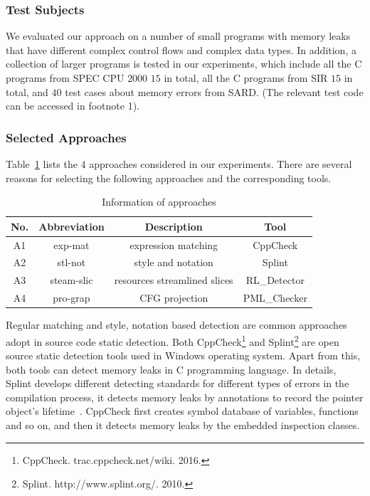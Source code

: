 \subsubsection{Test Subjects}\label{ssec:ts}
We evaluated our approach on a number of small programs with memory leaks that have different complex control flows and complex data types. In addition, a collection of larger programs is tested in our experiments, which include all the C programs from SPEC CPU $2000$ $15$ in total, all the C programs from SIR $15$ in total, and $40$ test cases about memory errors from SARD. (The relevant test code can be accessed in footnote 1).
\subsubsection{Selected Approaches}\label{ssec:ca}
Table~\ref{tab:1} lists the $4$ approaches considered in our experiments. There are several reasons for selecting the following approaches and the corresponding tools. 
%
\begin{table}[!h]
\center
\caption{Information of approaches}\label{tab:1}
\begin{tabular}{|c|c|c|c|}
\hline
\textbf{No.} & \textbf{Abbreviation} & \textbf{Description} & \textbf{Tool}\\
\hline
A1 & exp-mat & expression matching & CppCheck\\
\hline
A2 & stl-not & style and notation &	Splint\\
\hline
A3 & steam-slic & resources streamlined slices & RL\_Detector\\
\hline
A4 & pro-grap &	CFG projection &	PML\_Checker\\
\hline
\end{tabular}
\end{table}
%
Regular matching and style, notation based detection are common approaches adopt in source code static detection. Both CppCheck\footnote{CppCheck. trac.cppcheck.net/wiki. 2016.} and Splint\footnote{Splint. http://www.splint.org/. 2010.} are open source static detection tools used in Windows operating system. Apart from this, both tools can detect memory leaks in C programming language. In details, Splint develops different detecting standards for different types of errors in the compilation process, it detects memory leaks by annotations to record the pointer object’s lifetime~\cite{EL02}. CppCheck first creates symbol database of variables, functions and so on, and then it detects memory leaks by the embedded inspection classes.
 

